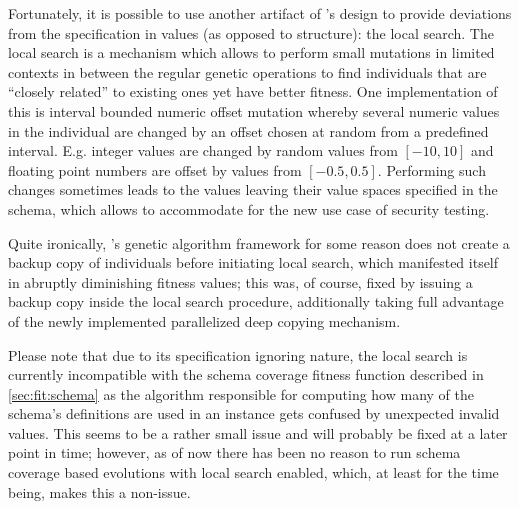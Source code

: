 Fortunately, it is possible to use another artifact of \evosuite's design to provide deviations from the 
specification in values (as opposed to structure): the local search. 
The local search is a mechanism which allows to perform small mutations in limited contexts in between 
the regular genetic operations to find individuals that are ``closely related'' to existing ones
yet have better fitness. One implementation of this is interval bounded numeric offset mutation whereby
several numeric values in the individual are changed by an offset chosen at random from a predefined 
interval. E.g. integer values are changed by random values from $[-10,10]$ and floating point numbers 
are offset by values from $[-0.5,0.5]$.
Performing such changes sometimes leads to the values leaving their value spaces specified in the schema, 
which allows to accommodate for the new use case of security testing.

Quite ironically, \evosuite's genetic algorithm framework for some reason does not create a backup 
copy of individuals before initiating local search, which manifested itself in abruptly diminishing 
fitness values; this was, of course, fixed by issuing a backup copy inside the local search procedure, 
additionally taking full advantage of the newly implemented parallelized deep copying mechanism.

Please note that due to its specification ignoring nature, the local search is currently incompatible with the
schema coverage fitness function described in \cref{sec:fit:schema} as the algorithm responsible for computing
how many of the schema's definitions are used in an \xml instance gets confused by unexpected invalid values.
This seems to be a rather small issue and will probably be fixed at a later point in time; however, as of now
there has been no reason to run schema coverage based evolutions with local search enabled, which, at least for
the time being, makes this a non-issue.
